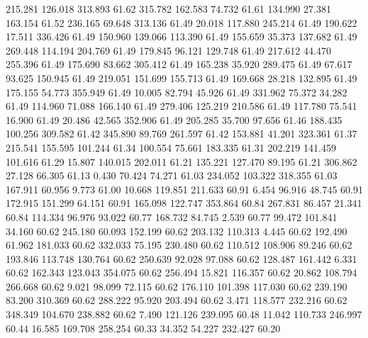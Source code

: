  215.281  126.018  313.893        61.62
 315.782  162.583   74.732        61.61
 134.990   27.381  163.154        61.52
 236.165   69.648  313.136        61.49
  20.018  117.880  245.214        61.49
 190.622   17.511  336.426        61.49
 150.960  139.066  113.390        61.49
 155.659   35.373  137.682        61.49
 269.448  114.194  204.769        61.49
 179.845   96.121  129.748        61.49
 217.612   44.470  255.396        61.49
 175.690   83.662  305.412        61.49
 165.238   35.920  289.475        61.49
  67.617   93.625  150.945        61.49
 219.051  151.699  155.713        61.49
 169.668   28.218  132.895        61.49
 175.155   54.773  355.949        61.49
  10.005   82.794   45.926        61.49
 331.962   75.372   34.282        61.49
 114.960   71.088  166.140        61.49
 279.406  125.219  210.586        61.49
 117.780   75.541   16.900        61.49
  20.486   42.565  352.906        61.49
 205.285   35.700   97.656        61.46
 188.435  100.256  309.582        61.42
 345.890   89.769  261.597        61.42
 153.881   41.201  323.361        61.37
 215.541  155.595  101.244        61.34
 100.554   75.661  183.335        61.31
 202.219  141.459  101.616        61.29
  15.807  140.015  202.011        61.21
 135.221  127.470   89.195        61.21
 306.862   27.128   66.305        61.13
   0.430   70.424   74.271        61.03
 234.052  103.322  318.355        61.03
 167.911   60.956    9.773        61.00
  10.668  119.851  211.633        60.91
   6.454   96.916   48.745        60.91
 172.915  151.299   64.151        60.91
 165.098  122.747  353.864        60.84
 267.831   86.457   21.341        60.84
 114.334   96.976   93.022        60.77
 168.732   84.745    2.539        60.77
  99.472  101.841   34.160        60.62
 245.180   60.093  152.199        60.62
 203.132  110.313    4.445        60.62
 192.490   61.962  181.033        60.62
 332.033   75.195  230.480        60.62
 110.512  108.906   89.246        60.62
 193.846  113.748  130.764        60.62
 250.639   92.028   97.088        60.62
 128.487  161.442    6.331        60.62
 162.343  123.043  354.075        60.62
 256.494   15.821  116.357        60.62
  20.862  108.794  266.668        60.62
   9.021   98.099   72.115        60.62
 176.110  101.398  117.030        60.62
 239.190   83.200  310.369        60.62
 288.222   95.920  203.494        60.62
   3.471  118.577  232.216        60.62
 348.349  104.670  238.882        60.62
   7.490  121.126  239.095        60.48
  11.042  110.733  246.997        60.44
  16.585  169.708  258.254        60.33
  34.352   54.227  232.427        60.20

